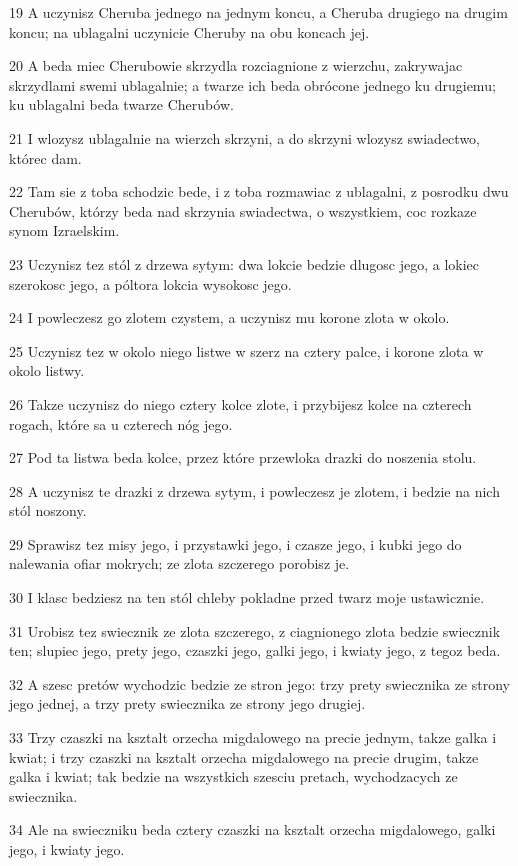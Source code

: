 \par 19 A uczynisz Cheruba jednego na jednym koncu, a Cheruba drugiego na drugim koncu; na ublagalni uczynicie Cheruby na obu koncach jej.
\par 20 A beda miec Cherubowie skrzydla rozciagnione z wierzchu, zakrywajac skrzydlami swemi ublagalnie; a twarze ich beda obrócone jednego ku drugiemu; ku ublagalni beda twarze Cherubów.
\par 21 I wlozysz ublagalnie na wierzch skrzyni, a do skrzyni wlozysz swiadectwo, którec dam.
\par 22 Tam sie z toba schodzic bede, i z toba rozmawiac z ublagalni, z posrodku dwu Cherubów, którzy beda nad skrzynia swiadectwa, o wszystkiem, coc rozkaze synom Izraelskim.
\par 23 Uczynisz tez stól z drzewa sytym: dwa lokcie bedzie dlugosc jego, a lokiec szerokosc jego, a póltora lokcia wysokosc jego.
\par 24 I powleczesz go zlotem czystem, a uczynisz mu korone zlota w okolo.
\par 25 Uczynisz tez w okolo niego listwe w szerz na cztery palce, i korone zlota w okolo listwy.
\par 26 Takze uczynisz do niego cztery kolce zlote, i przybijesz kolce na czterech rogach, które sa u czterech nóg jego.
\par 27 Pod ta listwa beda kolce, przez które przewloka drazki do noszenia stolu.
\par 28 A uczynisz te drazki z drzewa sytym, i powleczesz je zlotem, i bedzie na nich stól noszony.
\par 29 Sprawisz tez misy jego, i przystawki jego, i czasze jego, i kubki jego do nalewania ofiar mokrych; ze zlota szczerego porobisz je.
\par 30 I klasc bedziesz na ten stól chleby pokladne przed twarz moje ustawicznie.
\par 31 Urobisz tez swiecznik ze zlota szczerego, z ciagnionego zlota bedzie swiecznik ten; slupiec jego, prety jego, czaszki jego, galki jego, i kwiaty jego, z tegoz beda.
\par 32 A szesc pretów wychodzic bedzie ze stron jego: trzy prety swiecznika ze strony jego jednej, a trzy prety swiecznika ze strony jego drugiej.
\par 33 Trzy czaszki na ksztalt orzecha migdalowego na precie jednym, takze galka i kwiat; i trzy czaszki na ksztalt orzecha migdalowego na precie drugim, takze galka i kwiat; tak bedzie na wszystkich szesciu pretach, wychodzacych ze swiecznika.
\par 34 Ale na swieczniku beda cztery czaszki na ksztalt orzecha migdalowego, galki jego, i kwiaty jego.
